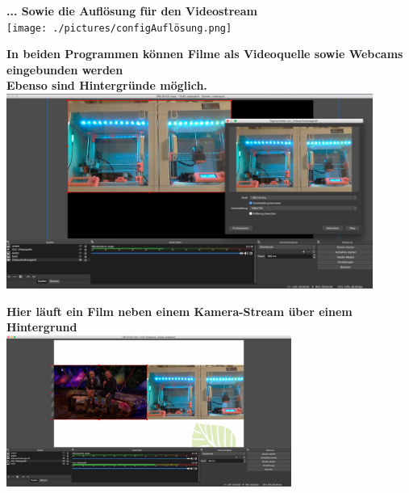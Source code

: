 \begin{center}
  \textbf{... Sowie die Auflösung für den Videostream} \\
  {\vspace{0.3cm}}
  \texttt{[image: ./pictures/configAuflösung.png]}
\end{center}



\newpage
\begin{center}
  \textbf{In beiden Programmen können Filme als Videoquelle sowie Webcams eingebunden werden} \\
  \textbf{Ebenso sind Hintergründe möglich.} \\
  {\vspace{0.3cm}}
  \includegraphics[width=0.9\textwidth]{./pictures/usbcamOBS.png}
\end{center}

\begin{center}
  \textbf{Hier läuft ein Film neben einem Kamera-Stream über einem Hintergrund } \\
  {\vspace{0.3cm}}
  \includegraphics[width=0.7\textwidth]{./pictures/videoCAMsideBYside.png}
\end{center}
